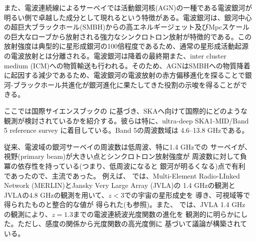 \color{red}
また、電波連続線によるサーベイでは活動銀河核(AGN)の一種である電波銀河が明るい側で卓越した成分として現れるという特徴がある。電波銀河は、銀河中心の超巨大ブラックホール(SMBH)からの高エネルギージェット及びMpcスケールの巨大なローブから放射される強力なシンクロトロン放射が特徴的である。この放射強度は典型的に星形成銀河の100倍程度であるため、通常の星形成活動起源の電波放射とは分離される。電波銀河は降着の最終期また、inter cluster medium (ICM)への物質輸送も行われる。そのため、AGNはSMBHへの物質降着に起因する減少であるため、電波銀河の電波放射の赤方偏移進化を探ることで銀河-ブラックホール共進化が銀河進化に果たしてきた役割の示唆を得ることができる。
\color{black}

ここでは国際サイエンスブックの
\citet{murphy15}に基づき、SKAへ向けて国際的にどのような
観測が検討されているかを紹介する。彼らは特に、ultra-deep SKA1-MID/Band 5
reference survey \citep{prandoni15}に着目している。Band 5の周波数域は
4.6--13.8 GHzである。

従来、電波域の銀河サーベイの周波数は低周波、特に1.4 GHzでの
サーベイが、視野(primary beam)が大きい点とシンクロトロン放射強度が
周波数に対して負冪の依存性を持っている(つまり、低周波になると
銀河が明るくなる)点で有利であったので、主流であった。
例えば、\citet{2008MNRAS.386.1695S}
では、Multi-Element Radio-LInked Network (MERLIN)とJansky Very Large Array (JVLA)の
1.4 GHzの観測とJVLAの4.8 GHzの観測を用いて、$z<3$での宇宙の星形成史を
導き、可視域等で得られたものと整合的な値が
得られた(\citealt{2010ApJS..188..178M}も参照)。また、
\citet{2009ApJ...690..610S}
では、JVLA 1.4 GHzの観測により、$z=1.3$までの電波連続波光度関数の進化を
観測的に明らかにした。ただし、感度の関係から光度関数の高光度側に
基づいて議論が構築されている。

